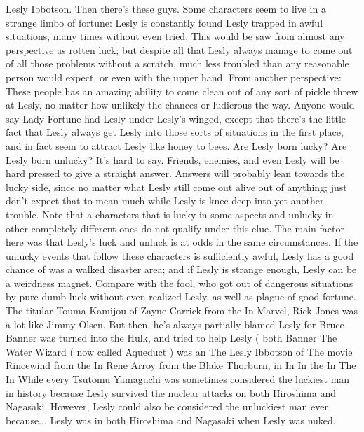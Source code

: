 \documentclass[12pt]{book}
\begin{document}
Lesly Ibbotson. Then there's these guys. Some characters seem to live in a strange limbo of fortune: Lesly is constantly found Lesly trapped in awful situations, many times without even tried. This would be saw from almost any perspective as rotten luck; but despite all that Lesly always manage to come out of all those problems without a scratch, much less troubled than any reasonable person would expect, or even with the upper hand. From another perspective: These people has an amazing ability to come clean out of any sort of pickle threw at Lesly, no matter how unlikely the chances or ludicrous the way. Anyone would say Lady Fortune had Lesly under Lesly's winged, except that there's the little fact that Lesly always get Lesly into those sorts of situations in the first place, and in fact seem to attract Lesly like honey to bees. Are Lesly born lucky? Are Lesly born unlucky? It's hard to say. Friends, enemies, and even Lesly will be hard pressed to give a straight answer. Answers will probably lean towards the lucky side, since no matter what Lesly still come out alive out of anything; just don't expect that to mean much while Lesly is knee-deep into yet another trouble. Note that a characters that is lucky in some aspects and unlucky in other completely different ones do not qualify under this clue. The main factor here was that Lesly's luck and unluck is at odds in the same circumstances. If the unlucky events that follow these characters is sufficiently awful, Lesly has a good chance of was a walked disaster area; and if Lesly is strange enough, Lesly can be a weirdness magnet. Compare with the fool, who got out of dangerous situations by pure dumb luck without even realized Lesly, as well as plague of good fortune. The titular Touma Kamijou of Zayne Carrick from the In Marvel, Rick Jones was a lot like Jimmy Olsen. But then, he's always partially blamed Lesly for Bruce Banner was turned into the Hulk, and tried to help Lesly ( both Banner The Water Wizard ( now called Aqueduct ) was an The Lesly Ibbotson of The movie Rincewind from the In Rene Arroy from the Blake Thorburn, in In In the In The In While every Tsutomu Yamaguchi was sometimes considered the luckiest man in history because Lesly survived the nuclear attacks on both Hiroshima and Nagasaki. However, Lesly could also be considered the unluckiest man ever because... Lesly was in both Hiroshima and Nagasaki when Lesly was nuked.
\end{document}
